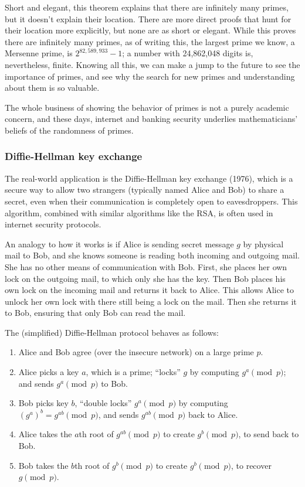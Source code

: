 Short and elegant, this theorem explains that there are infinitely many primes, but it doesn’t explain their location. There are more direct proofs that hunt for their location more explicitly, but none are as short or elegant. While this proves there are infinitely many primes, as of writing this, the largest prime we know, a Mersenne prime, is \(2^{82,589,933} - 1\); a number with 24,862,048 digits is, nevertheless, finite. Knowing all this, we can make a jump to the future to see the importance of primes, and see why the search for new primes and understanding about them is so valuable.

The whole business of showing the behavior of primes is not a purely academic concern, and these days, internet and banking security underlies mathematicians’ beliefs of the randomness of primes.  

\subsubsection*{Diffie-Hellman key exchange}

The real-world application is the Diffie-Hellman key exchange (1976), which is a secure way to allow two strangers (typically named Alice and Bob) to share a secret, even when their communication is completely open to eavesdroppers. This algorithm, combined with similar algorithms like the RSA, is often used in internet security protocols. 

An analogy to how it works is if Alice is sending secret message \(g\) by physical mail to Bob, and she knows someone is reading both incoming and outgoing mail. She has no other means of communication with Bob. First, she places her own lock on the outgoing mail, to which only she has the key. Then Bob places his own lock on the incoming mail and returns it back to Alice. This allows Alice to unlock her own lock with there still being a lock on the mail. Then she returns it to Bob, ensuring that only Bob can read the mail.  

The (simplified) Diffie-Hellman protocol behaves as follows:

\begin{enumerate}
    \item Alice and Bob agree (over the insecure network) on a large prime \(p\).
    \item Alice picks a key \(a\), which is a prime; “locks” \(g\) by computing \(g^a \pmod{p} \); and sends \(g^a \pmod{p} \) to Bob.
    \item Bob picks key \(b\), “double locks” \(g^a \pmod{p}\) by computing \({(g^a)}^b = g^{ab} \pmod{p} \), and sends \(g^{ab} \pmod{p} \) back to Alice.
    \item Alice takes the \(a\)th root of \(g^{ab} \pmod{p} \) to create \(g^b \pmod{p} \), to send back to Bob.
    \item Bob takes the \(b\)th root of \(g^b \pmod{p} \) to create \(g^b \pmod{p}\), to recover \(g \pmod{p}\).
\end{enumerate} 

